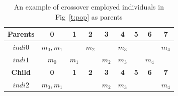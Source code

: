 \documentclass[journal]{IEEEtran}
\theoremstyle{remark}
\begin{document}
\begin{table}[!t]
	\renewcommand{\arraystretch}{1.3}
	\newcommand{\tabincell}[2]{\begin{tabular}{@{}#1@{}}#2\end{tabular}}
	\caption{An example of crossover employed individuals in Fig~\ref{t:pop} as parents}
	\label{t:crossover}
	\centering
	\begin{tabular}{|c||c||c||c||c||c||c||c||c|}
		\hline
		\textbf{Parents}& 
		\textbf{0} & 
		\textbf{1} & 
		\textbf{2} & 
		\textbf{3} &
		\textbf{4} & 
		\textbf{5} & 
		\textbf{6} & 
		\textbf{7} \\		
		\hline
		$indi0$	&$m_0,m_1$&	&$m_2$&	&$m_3$& & &$m_4$\\		
		\hline		
		$indi1$	&$m_0$&$m_1$&	&$m_2$&$m_3$& &$m_4$&	\\		
		\hline
		\hline
			\textbf{Child}& 
			\textbf{0} & 
			\textbf{1} & 
			\textbf{2} & 
			\textbf{3} &
			\textbf{4} & 
			\textbf{5} & 
			\textbf{6} & 
			\textbf{7} \\		
			\hline
			$indi2$	&$m_0,m_1$&	& &$m_2$&$m_3$& & &$m_4$\\			
		\hline
	\end{tabular}
\end{table}
\end{document}
